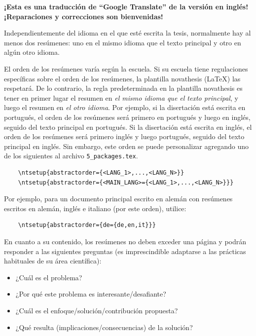 
%

\textbf{¡Esta es una traducción de “Google Translate” de la versión en inglés! ¡Reparaciones y correcciones son bienvenidas!}

Independientemente del idioma en el que esté escrita la tesis, normalmente hay al menos dos resúmenes: uno en el mismo idioma que el texto principal y otro en algún otro idioma.

El orden de los resúmenes varía según la escuela. Si su escuela tiene regulaciones específicas sobre el orden de los resúmenes, la plantilla \gls{novathesis} (\LaTeX) las respetará. De lo contrario, la regla predeterminada en la plantilla \gls{novathesis} es tener en primer lugar el resumen en \emph{el mismo idioma que el texto principal}, y luego el resumen en \emph{el otro idioma}. Por ejemplo, si la disertación está escrita en portugués, el orden de los resúmenes será primero en portugués y luego en inglés, seguido del texto principal en portugués. Si la disertación está escrita en inglés, el orden de los resúmenes será primero inglés y luego portugués, seguido del texto principal en inglés.
%
Sin embargo, este orden se puede personalizar agregando uno de los siguientes al archivo \verb+5_packages.tex+.
%

\begin{verbatim}
    \ntsetup{abstractorder={<LANG_1>,...,<LANG_N>}}
    \ntsetup{abstractorder={<MAIN_LANG>={<LANG_1>,...,<LANG_N>}}}
\end{verbatim}

Por ejemplo, para un documento principal escrito en alemán con resúmenes escritos en alemán, inglés e italiano (por este orden), utilice:
\begin{verbatim}
    \ntsetup{abstractorder={de={de,en,it}}}
\end{verbatim}

En cuanto a su contenido, los resúmenes no deben exceder una página y podrán responder a las siguientes preguntas (es imprescindible adaptarse a las prácticas habituales de su área científica):

\begin{itemize}
  \item ¿Cuál es el problema?
  \item ¿Por qué este problema es interesante/desafiante?
  \item ¿Cuál es el enfoque/solución/contribución propuesta?
  \item ¿Qué resulta (implicaciones/consecuencias) de la solución?
\end{itemize}

